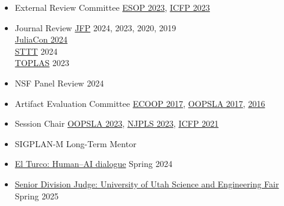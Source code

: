 \documentclass[11pt]{article}
\begin{document}
\begin{itemize}
  \item {External Review Committee} \hfill \href{https://etaps.org/2023/esop}{ESOP 2023},
                                           \href{https://icfp23.sigplan.org/}{ICFP 2023}
  \item {Journal Review}
           \hfill \href{https://www.cambridge.org/core/journals/journal-of-functional-programming}{JFP} 2024, 2023, 2020, 2019 \\ %
    \hbox{}\hfill \href{https://juliacon.org/2024/}{JuliaCon 2024} \\
    \hbox{}\hfill \href{https://link.springer.com/journal/10009}{STTT} 2024 \\
    \hbox{}\hfill \href{https://dl.acm.org/journal/toplas}{TOPLAS} 2023 %
  \item {NSF Panel Review} \hfill {2024}
  \item {Artifact Evaluation Committee} \hfill \href{https://2017.ecoop.org/track/ecoop-2017-Artifacts}{ECOOP 2017},
                                               \href{https://2017.splashcon.org/track/splash-2017-OOPSLA-Artifacts}{OOPSLA 2017},
                                               \href{http://2016.splashcon.org/track/splash-2016-artifacts}{2016}
  \item {Session Chair} \hfill \href{https://2023.splashcon.org/program/program-splash-2023/?date=Wed%2025%20Oct%202023&room=Room%20II}{OOPSLA 2023},
                               \href{https://www.njpls.org/nov2023.html}{NJPLS 2023},
                               \href{https://icfp21.sigplan.org/program/program-icfp-2021/}{ICFP 2021}
                             \item {SIGPLAN-M Long-Term Mentor} \hfill {}
  \item \href{https://elturco.diemutstrebe.com}{El Turco: Human--AI dialogue} \hfill Spring 2024
  \item \href{https://usef.utah.edu/fair-details}{Senior Division Judge: University of Utah Science and Engineering Fair} \hfill Spring 2025

\end{itemize}

\end{document}
